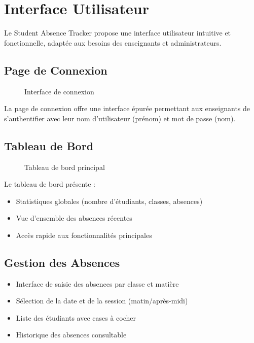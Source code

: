 \section{Interface Utilisateur}
\label{sec:interface_utilisateur}

Le Student Absence Tracker propose une interface utilisateur intuitive et fonctionnelle, adaptée aux besoins des enseignants et administrateurs.

\subsection{Page de Connexion}
\begin{figure}[h]
    \centering
    \caption{Interface de connexion}
    \label{fig:login}
\end{figure}

La page de connexion offre une interface épurée permettant aux enseignants de s'authentifier avec leur nom d'utilisateur (prénom) et mot de passe (nom).

\subsection{Tableau de Bord}
\begin{figure}[h]
    \centering
    \caption{Tableau de bord principal}
    \label{fig:dashboard}
\end{figure}

Le tableau de bord présente :
\begin{itemize}
    \item Statistiques globales (nombre d'étudiants, classes, absences)
    \item Vue d'ensemble des absences récentes
    \item Accès rapide aux fonctionnalités principales
\end{itemize}

\subsection{Gestion des Absences}
\begin{itemize}
    \item Interface de saisie des absences par classe et matière
    \item Sélection de la date et de la session (matin/après-midi)
    \item Liste des étudiants avec cases à cocher
    \item Historique des absences consultable
\end{itemize}

